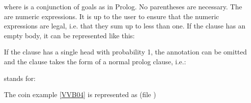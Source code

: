 \documentclass[letterpaper,10pt,english]{sphinxmanual}
\begin{document}
\begin{sphinxVerbatim}[commandchars=\\\{\}]
      
\end{sphinxVerbatim}

\sphinxAtStartPar
where  is a conjunction of goals as in Prolog.
No parentheses are necessary.
The  are numeric expressions.
It is up to the user to ensure that the numeric expressions are legal, i.e. that they sum up to less than one.
If the clause has an empty body, it can be represented like this:

\begin{sphinxVerbatim}[commandchars=\\\{\}]
    
\end{sphinxVerbatim}

\sphinxAtStartPar
If the clause has a single head with probability 1, the annotation can be omitted and the clause takes
the form of a normal prolog clause, i.e.:

\begin{sphinxVerbatim}[commandchars=\\\{\}]
  
\end{sphinxVerbatim}

\sphinxAtStartPar
stands for:

\begin{sphinxVerbatim}[commandchars=\\\{\}]
  
\end{sphinxVerbatim}

\sphinxAtStartPar
The coin example {[}\hyperlink{cite.index:id45}{VVB04}{]} is represented as (file )
\end{document}
